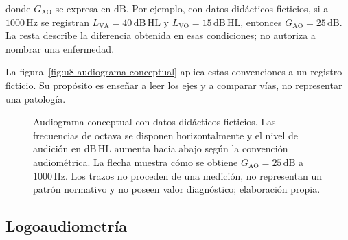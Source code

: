 donde \(G_{\mathrm{AO}}\) se expresa en \(\mathrm{dB}\). Por ejemplo, con
datos didácticos ficticios, si a \(1000\,\mathrm{Hz}\) se registran
\(L_{\mathrm{VA}}=40\,\mathrm{dB\,HL}\) y
\(L_{\mathrm{VO}}=15\,\mathrm{dB\,HL}\), entonces
\(G_{\mathrm{AO}}=25\,\mathrm{dB}\). La resta describe la diferencia
obtenida en esas condiciones; no autoriza a nombrar una enfermedad.

La figura~\ref{fig:u8-audiograma-conceptual} aplica estas convenciones a un
registro ficticio. Su propósito es enseñar a leer los ejes y a comparar vías,
no representar una patología.

\begin{figure}[htbp]
    \centering
    
    \caption{Audiograma conceptual con datos didácticos ficticios. Las
    frecuencias de octava se disponen horizontalmente y el nivel de audición
    en \(\mathrm{dB\,HL}\) aumenta hacia abajo según la convención
    audiométrica. La flecha muestra cómo se obtiene
    \(G_{\mathrm{AO}}=25\,\mathrm{dB}\) a \(1000\,\mathrm{Hz}\). Los trazos no
    proceden de una medición, no representan un patrón normativo y no poseen
    valor diagnóstico; elaboración propia.}
    \label{fig:u8-audiograma-conceptual}
    \label{fig:presbiacusia}
\end{figure}

\subsection{Logoaudiometría}
\label{sec:u8-logoaudiometria}

